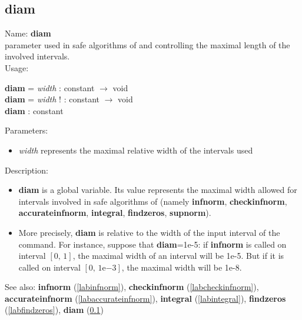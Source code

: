 \subsection{diam}
\label{labdiam}
\noindent Name: \textbf{diam}\\
parameter used in safe algorithms of \sollya and controlling the maximal length of the involved intervals.\\
\noindent Usage: 
\begin{center}
\textbf{diam} = \emph{width} : \textsf{constant} $\rightarrow$ \textsf{void}\\
\textbf{diam} = \emph{width} ! : \textsf{constant} $\rightarrow$ \textsf{void}\\
\textbf{diam} : \textsf{constant}\\
\end{center}
Parameters: 
\begin{itemize}
\item \emph{width} represents the maximal relative width of the intervals used
\end{itemize}
\noindent Description: \begin{itemize}

\item \textbf{diam} is a global variable. Its value represents the maximal width allowed
   for intervals involved in safe algorithms of \sollya (namely \textbf{infnorm},
   \textbf{checkinfnorm}, \textbf{accurateinfnorm}, \textbf{integral}, \textbf{findzeros}, \textbf{supnorm}).

\item More precisely, \textbf{diam} is relative to the width of the input interval of
   the command. For instance, suppose that \textbf{diam}=1e-5: if \textbf{infnorm} is called
   on interval $[0,\,1]$, the maximal width of an interval will be 1e-5. But if it
   is called on interval $[0,\,1\mathrm{e}{-3}]$, the maximal width will be 1e-8.
\end{itemize}
See also: \textbf{infnorm} (\ref{labinfnorm}), \textbf{checkinfnorm} (\ref{labcheckinfnorm}), \textbf{accurateinfnorm} (\ref{labaccurateinfnorm}), \textbf{integral} (\ref{labintegral}), \textbf{findzeros} (\ref{labfindzeros}), \textbf{diam} (\ref{labdiam})
